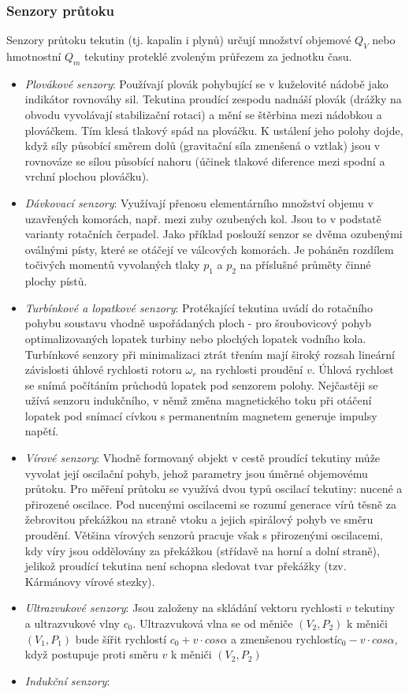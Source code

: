 \subsubsection*{Senzory průtoku}
Senzory průtoku tekutin (tj. kapalin i plynů) určují množství objemové $ Q_V $ nebo hmotnostní $ Q_m $ tekutiny proteklé zvoleným průřezem za jednotku času.
\begin{itemize}
\item \textit{Plovákové senzory}: Používají plovák pohybující se v kuželovité nádobě jako indikátor rovnováhy sil. Tekutina proudící zespodu nadnáší plovák (drážky na obvodu vyvolávají stabilizační rotaci) a mění se štěrbina mezi nádobkou a plováčkem. Tím klesá tlakový spád na plováčku. K ustálení jeho polohy dojde, když síly působící směrem dolů (gravitační síla zmenšená o vztlak) jsou v rovnováze se sílou působící nahoru (účinek tlakové diference mezi spodní a vrchní plochou plováčku).
\item \textit{Dávkovací senzory}: Využívají přenosu elementárního množství objemu v uzavřených komorách, např. mezi zuby ozubených kol. Jsou to v podstatě varianty rotačních čerpadel. Jako příklad poslouží senzor se dvěma ozubenými oválnými písty, které se otáčejí ve válcových komorách. Je poháněn rozdílem točivých momentů vyvolaných tlaky $ p_1 $ a $ p_2 $ na příslušné průměty činné plochy pístů.
\item \textit{Turbínkové a lopatkové senzory}: Protékající tekutina uvádí do rotačního pohybu soustavu vhodně uspořádaných ploch - pro šroubovicový pohyb optimalizovaných lopatek turbiny nebo plochých lopatek vodního kola. Turbínkové senzory při minimalizaci ztrát třením mají široký rozsah lineární závislosti úhlové rychlosti rotoru $ \omega_r $ na rychlosti proudění $ v $. Úhlová rychlost se snímá počítáním průchodů lopatek pod senzorem polohy. Nejčastěji se užívá senzoru indukčního, v němž změna magnetického toku při otáčení lopatek pod snímací cívkou s permanentním magnetem generuje impulsy napětí.
\item \textit{Vírové senzory}: Vhodně formovaný objekt v cestě proudící tekutiny může vyvolat její oscilační pohyb, jehož parametry jsou úměrné objemovému průtoku. Pro měření průtoku se využívá dvou typů oscilací tekutiny: nucené a přirozené oscilace. Pod nucenými oscilacemi se rozumí generace vírů těsně za žebrovitou překážkou na straně vtoku a jejich spirálový pohyb ve směru proudění. Většina vírových senzorů pracuje však s přirozenými oscilacemi, kdy víry jsou oddělovány za překážkou (střídavě na horní a dolní straně), jelikož proudící tekutina není schopna sledovat tvar překážky (tzv. Kármánovy vírové stezky).
\item \textit{Ultrazvukové senzory}: Jsou založeny na skládání vektoru rychlosti $ v $ tekutiny a ultrazvukové vlny $ c_0 $. Ultrazvuková vlna se od měniče $ (V_2, P_2) $ k měniči $ (V_1, P_1) $ bude šířit rychlostí $ c_0 + v \cdot cos \alpha $ a zmenšenou rychlostí$ c_0 - v \cdot cos \alpha $, když postupuje proti směru $ v $ k měniči $ (V_2, P_2) $
\item \textit{Indukční senzory}: 
\end{itemize}

